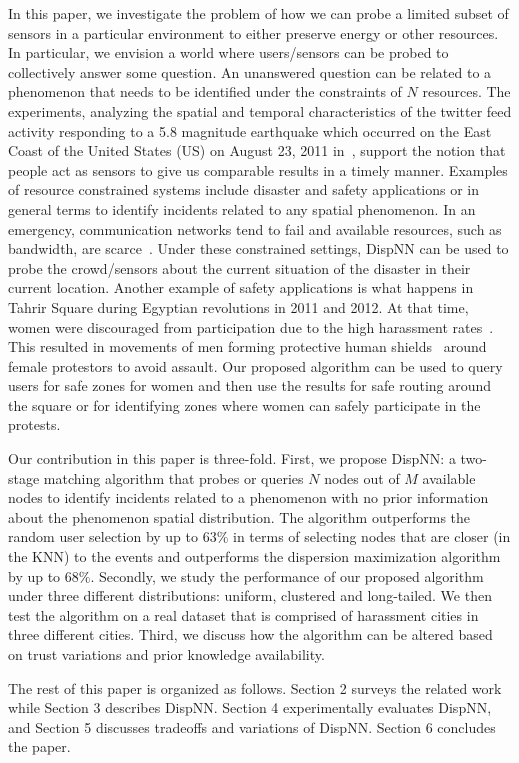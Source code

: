 \documentclass{acm_proc_article-sp}
\begin{document}
In this paper, we investigate the problem of how we can probe a limited subset of sensors in a particular environment to either preserve energy or other resources. In particular, we envision a world where users/sensors can be probed to collectively answer some question. An unanswered question can be related to a phenomenon that needs to be identified under the constraints of $N$ resources. The experiments, analyzing the spatial and temporal characteristics of the twitter feed activity responding to a 5.8 magnitude earthquake which occurred on the East Coast of the United States (US) on August 23, 2011 in~\cite{crooks2013earthquake}, support the notion that people act as sensors to give us comparable results in a timely manner. Examples of resource constrained systems include disaster and safety applications or in general terms to identify incidents related to any spatial phenomenon. In an emergency, communication networks tend to fail and available resources, such as bandwidth, are scarce~\cite{manoj2007communication}. Under these constrained settings, DispNN can be used to probe the crowd/sensors about the current situation of the disaster in their current location. Another example of safety applications is what happens in Tahrir Square during Egyptian revolutions in 2011 and 2012. At that time, women were discouraged from participation due to the high harassment rates~\cite{guardianSH}. This resulted in movements of men forming protective human shields~\cite{worldPostHS} around female protestors to avoid assault. Our proposed algorithm can be used to query users for safe zones for women and then use the results for safe routing around the square or for identifying zones where women can safely participate in the protests. \par
Our contribution in this paper is three-fold. First, we propose DispNN: a two-stage matching algorithm that probes or queries $N$ nodes out of $M$ available nodes to identify incidents related to a phenomenon with no prior information about the phenomenon spatial distribution. The algorithm outperforms the random user selection by up to $63\%$ in terms of selecting nodes that are closer (in the KNN) to the events and outperforms the dispersion maximization algorithm by up to $68\%$. Secondly, we study the performance of our proposed algorithm under three different distributions: uniform, clustered and long-tailed. We then test the algorithm on a real dataset that is comprised of harassment cities in three different cities. Third, we discuss how the algorithm can be altered based on trust variations and prior knowledge availability.\par
The rest of this paper is organized as follows. Section 2 surveys the related work while Section 3 describes DispNN. Section 4 experimentally evaluates DispNN, and Section 5 discusses tradeoffs and variations of DispNN. Section 6 concludes the paper.
\end{document}
